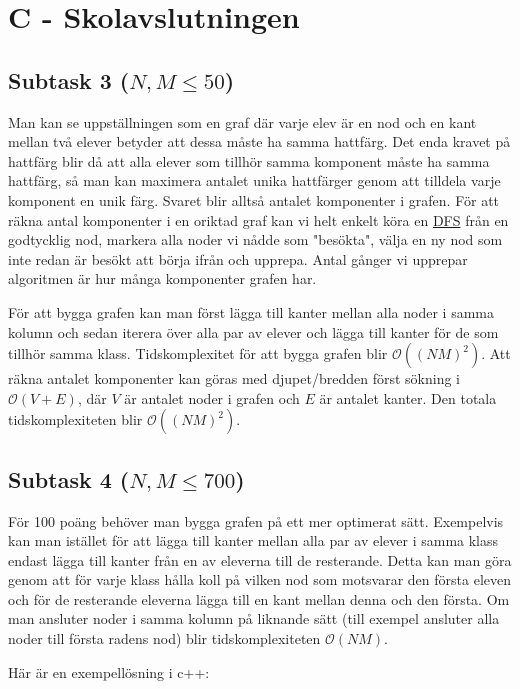 \section*{C - Skolavslutningen}
    
\subsection*{Subtask 3 ($N, M \leq 50$)}
Man kan se uppställningen som en graf där varje elev är en nod och en kant mellan två elever betyder att dessa måste ha samma hattfärg. Det enda kravet på hattfärg blir då att alla elever som tillhör samma komponent måste ha samma hattfärg, så man kan maximera antalet unika hattfärger genom att tilldela varje komponent en unik färg. Svaret blir alltså antalet komponenter i grafen. För att räkna antal komponenter i en oriktad graf kan vi helt enkelt köra en \href{https://en.wikipedia.org/wiki/Depth-first_search}{DFS} från en godtycklig nod, markera alla noder vi nådde som "besökta", välja en ny nod som inte redan är besökt att börja ifrån och upprepa. Antal gånger vi upprepar algoritmen är hur många komponenter grafen har.

För att bygga grafen kan man först lägga till kanter mellan alla noder i samma kolumn och sedan iterera över alla par av elever och lägga till kanter för de som tillhör samma klass. Tidskomplexitet för att bygga grafen blir $\mathcal{O}((NM)^2)$. Att räkna antalet komponenter kan göras med djupet/bredden först sökning i $\mathcal{O}(V + E)$, där $V$ är antalet noder i grafen och $E$ är antalet kanter. Den totala tidskomplexiteten blir $\mathcal{O}((NM)^2)$.

\subsection*{Subtask 4 ($N, M \leq 700$)}
För 100 poäng behöver man bygga grafen på ett mer optimerat sätt. Exempelvis kan man istället för att lägga till kanter mellan alla par av elever i samma klass endast lägga till kanter från en av eleverna till de resterande. Detta kan man göra genom att för varje klass hålla koll på vilken nod som motsvarar den första eleven och för de resterande eleverna lägga till en kant mellan denna och den första. Om man ansluter noder i samma kolumn på liknande sätt (till exempel ansluter alla noder till första radens nod) blir tidskomplexiteten $\mathcal{O}(NM)$.

Här är en exempellösning i c++:

